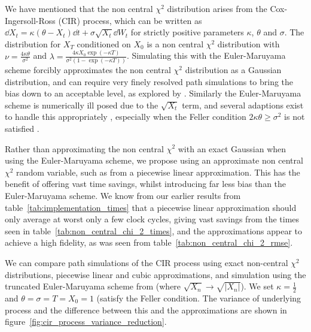 \documentclass[manuscript,review]{acmart}
\begin{document}
We have mentioned that the non central $ \chi^2 $ distribution arises from the Cox-Ingersoll-Ross (CIR) process, which can be written as $ \dd{X_t} = \kappa (\theta - X_t) \dd{t} + \sigma \sqrt{X_t} \dd{W_t} $ for strictly positive parameters $ \kappa $, $ \theta $ and $ \sigma $. The distribution for $ X_T $ conditioned on $ X_0 $ is a non central $ \chi^2 $ distribution with $ \nu = \tfrac{4\kappa\theta}{\sigma^2} $ and $ \lambda = \tfrac{4\kappa X_0 \exp(-\kappa T)}{\sigma^2(1 - \exp(-\kappa T))} $. Simulating this with the Euler-Maruyama scheme forcibly approximates the non central $ \chi^2 $ distribution as a Gaussian distribution, and can require very finely resolved path simulations to bring the bias down to an acceptable level, as explored by \citet{broadie2006exact}. Similarly the Euler-Maruyama scheme is numerically ill posed due to the $ \sqrt{X_t} $ term, and several adaptions exist to handle this appropriately \citep{deelstra1998convergence,lord2010comparison,berkaoui2008euler,higham2002strong,alfonsi2005discretization,alfonsi2008second,alfonsi2010high,dereich2012euler,cozma2020strong_euler,gyongy2011note}, especially when the Feller condition $ 2\kappa\theta \geq \sigma^2 $ is not satisfied \citep{feller1951two,gyongy1998note}.

Rather than approximating the non central $ \chi^2 $ with an exact Gaussian when using the Euler-Maruyama scheme, we propose using an approximate non central $ \chi^2 $ random variable, such as from a piecewise linear approximation. This has the benefit of offering vast time savings, whilst introducing far less bias than the Euler-Maruyama scheme. We know from our earlier results from table~\ref{tab:implementation_times} that a piecewise linear approximation should only average at worst only a few clock cycles, giving vast savings from the times seen in table~\ref{tab:non_central_chi_2_times}, and the approximations appear to achieve a high fidelity, as was seen from table~\ref{tab:non_central_chi_2_rmse}.

We can compare path simulations of the CIR process using exact non-central $ \chi^2 $ distributions, piecewise linear and cubic approximations, and simulation using the truncated Euler-Maruyama scheme from \citet{higham2002strong} (where $ \sqrt{X_n} \to \sqrt{\lvert X_n \rvert} $). We set $ \kappa= \tfrac{1}{2}$ and  $ \theta = \sigma =T = X_0 = 1 $ (satisfy the Feller condition. The variance of underlying process and the difference between this and the approximations are shown in figure~\ref{fig:cir_process_variance_reduction}. 
\end{document}
